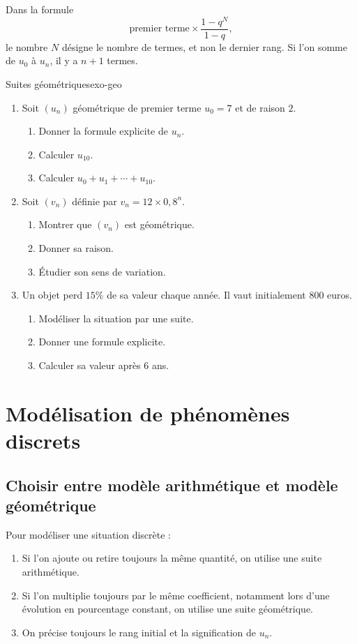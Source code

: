\documentclass[11pt,a4paper]{article}
\begin{document}
\begin{warningbox}
Dans la formule
\[
\text{premier terme}\times\frac{1-q^N}{1-q},
\]
le nombre $N$ désigne le nombre de termes, et non le dernier rang.
Si l'on somme de $u_0$ à $u_n$, il y a $n+1$ termes.
\end{warningbox}

\begin{exercisebox}{Suites géométriques}{exo-geo}
\begin{enumerate}
  \item Soit $(u_n)$ géométrique de premier terme $u_0=7$ et de raison $2$.
  \begin{enumerate}
    \item Donner la formule explicite de $u_n$.
    \item Calculer $u_{10}$.
    \item Calculer $u_0+u_1+\cdots+u_{10}$.
  \end{enumerate}
  \item Soit $(v_n)$ définie par $v_n=12\times0{,}8^n$.
  \begin{enumerate}
    \item Montrer que $(v_n)$ est géométrique.
    \item Donner sa raison.
    \item Étudier son sens de variation.
  \end{enumerate}
  \item Un objet perd $15\%$ de sa valeur chaque année. Il vaut initialement $800$ euros.
  \begin{enumerate}
    \item Modéliser la situation par une suite.
    \item Donner une formule explicite.
    \item Calculer sa valeur après $6$ ans.
  \end{enumerate}
\end{enumerate}
\end{exercisebox}

\section{Modélisation de phénomènes discrets}

\subsection{Choisir entre modèle arithmétique et modèle géométrique}

\begin{methodbox}
Pour modéliser une situation discrète :
\begin{enumerate}
  \item Si l'on ajoute ou retire toujours la même quantité, on utilise une suite arithmétique.
  \item Si l'on multiplie toujours par le même coefficient, notamment lors d'une évolution en pourcentage constant, on utilise une suite géométrique.
  \item On précise toujours le rang initial et la signification de $u_n$.
\end{enumerate}
\end{methodbox}
\end{document}
